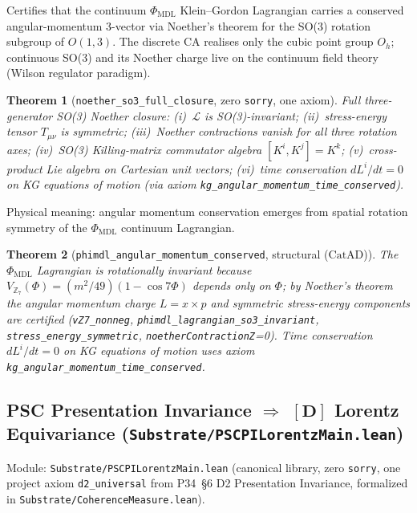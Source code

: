 \documentclass[11pt,a4paper]{article}
\newtheorem{theorem}{Theorem}[section]
\theoremstyle{definition}
\newcommand{\CatAD}{\ensuremath{\mathrm{CatAD}}}
\newcommand{\ZS}{\mathbb{Z}_7}
\begin{document}
Certifies that the continuum $\Phi_{\mathrm{MDL}}$ Klein--Gordon Lagrangian
carries a conserved angular-momentum 3-vector via Noether's theorem for the
SO(3) rotation subgroup of $O(1,3)$.  The discrete CA realises only the cubic
point group $O_h$; continuous SO(3) and its Noether charge live on the
continuum field theory (Wilson regulator paradigm).

\begin{theorem}[\lstinline|noether_so3_full_closure|, zero \texttt{sorry}, one axiom]
Full three-generator SO(3) Noether closure: (i)~$\mathcal{L}$ is SO(3)-invariant;
(ii)~stress-energy tensor $T_{\mu\nu}$ is symmetric; (iii)~Noether contractions
vanish for all three rotation axes; (iv)~SO(3) Killing-matrix commutator algebra
$[K^i,K^j]=K^k$; (v)~cross-product Lie algebra on Cartesian unit vectors;
(vi)~time conservation $dL^i/dt=0$ on KG equations of motion
(via axiom \lstinline|kg_angular_momentum_time_conserved|).
\end{theorem}

Physical meaning: angular momentum conservation emerges from spatial rotation
symmetry of the $\Phi_{\mathrm{MDL}}$ continuum Lagrangian.

\begin{theorem}[\lstinline|phimdl_angular_momentum_conserved|, structural ($\CatAD$)]
The $\Phi_{\mathrm{MDL}}$ Lagrangian is rotationally invariant because
$V_{\ZS}(\Phi)=(m^2/49)(1-\cos 7\Phi)$ depends only on $\Phi$; by Noether's theorem
the angular momentum charge $L=x\times p$ and symmetric stress-energy components are
certified (\lstinline|vZ7_nonneg|, \lstinline|phimdl_lagrangian_so3_invariant|,
\lstinline|stress_energy_symmetric|, \lstinline|noetherContractionZ|=0).  Time
conservation $dL^i/dt=0$ on KG equations of motion uses axiom
\lstinline|kg_angular_momentum_time_conserved|.
\end{theorem}

\subsection{PSC Presentation Invariance $\Rightarrow$ $[\mathbf{D}]$ Lorentz Equivariance
  (\texttt{Substrate/PSCPILorentzMain.lean})}\label{subsec:pscpi-lorentz-main}

Module: \texttt{Substrate/PSCPILorentzMain.lean} (canonical library, zero
\lstinline|sorry|, one project axiom \lstinline|d2_universal| from P34~\S6 D2
Presentation Invariance, formalized in \texttt{Substrate/CoherenceMeasure.lean}).
\end{document}
